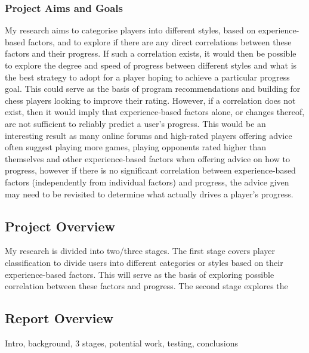 \documentclass[a4paper]{article}
\begin{document}
\subsubsection{Project Aims and Goals}
My research aims to categorise players into different styles, based on experience-based factors, and to explore if there are any direct correlations between these factors and their progress. If such a correlation exists, it would then be possible to explore the degree and speed of progress between different styles and what is the best strategy to adopt for a player hoping to achieve a particular progress goal. This could serve as the basis of program recommendations and building for chess players looking to improve their rating. However, if a correlation does not exist, then it would imply that experience-based factors alone, or changes thereof, are not sufficient to reliably predict a user's progress. This would be an interesting result as many online forums and high-rated players offering advice often suggest playing more games, playing opponents rated higher than themselves and other experience-based factors when offering advice on how to progress, however if there is no significant correlation between experience-based factors (independently from individual factors) and progress, the advice given may need to be revisited to determine what actually drives a player's progress.


\subsection{Project Overview}
My research is divided into two/three stages. The first stage covers player classification to divide users into different categories or styles based on their experience-based factors. This will serve as the basis of exploring possible correlation between these factors and progress. The second stage explores the 

\subsection{Report Overview}
Intro, background, 3 stages, potential work, testing, conclusions
\end{document}
